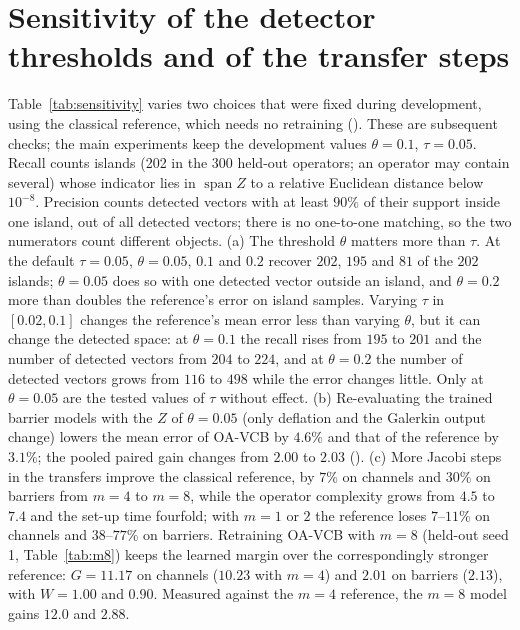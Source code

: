 \section{Sensitivity of the detector thresholds and of the transfer steps}\label{app:sensitivity}
Table~\ref{tab:sensitivity} varies two choices that were fixed during development, using the classical reference, which needs
no retraining (). These are subsequent checks; the main experiments keep
the development values $\theta = 0.1$, $\tau = 0.05$. Recall counts islands (202 in the 300 held-out operators; an operator may
contain several) whose indicator lies in $\operatorname{span}Z$ to a relative Euclidean distance below $10^{-8}$. Precision counts
detected vectors with at least $90\%$ of their support inside one island, out of all detected vectors; there is no one-to-one
matching, so the two numerators count different objects. (a) The threshold $\theta$ matters more than $\tau$. At the default
$\tau = 0.05$, $\theta = 0.05$, $0.1$ and $0.2$ recover $202$, $195$ and $81$ of the $202$ islands; $\theta = 0.05$ does so with one
detected vector outside an island, and $\theta = 0.2$ more than doubles the reference's error on island samples. Varying $\tau$
in $[0.02, 0.1]$ changes the reference's mean error less than varying $\theta$, but it can change the detected space: at
$\theta = 0.1$ the recall rises from $195$ to $201$ and the number of detected vectors from $204$ to $224$, and at $\theta = 0.2$
the number of detected vectors grows from $116$ to $498$ while the error changes little. Only at $\theta = 0.05$ are the tested
values of $\tau$ without effect. (b) Re-evaluating the trained barrier models with the $Z$ of $\theta = 0.05$ (only deflation
and the Galerkin output change) lowers the mean error of OA-VCB by $4.6\%$ and that of the reference by $3.1\%$; the pooled
paired gain changes from $2.00$ to $2.03$ (). (c) More Jacobi steps in the
transfers improve the classical reference, by $7\%$ on channels and $30\%$ on barriers from $m = 4$ to $m = 8$, while the
operator complexity grows from $4.5$ to $7.4$ and the set-up time fourfold; with $m = 1$ or $2$ the reference loses $7$--$11\%$ on
channels and $38$--$77\%$ on barriers. Retraining OA-VCB with $m = 8$ (held-out seed 1, Table~\ref{tab:m8}) keeps the learned
margin over the correspondingly stronger reference: $G = 11.17$ on channels ($10.23$ with $m = 4$) and $2.01$ on barriers
($2.13$), with $W = 1.00$ and $0.90$. Measured against the $m = 4$ reference, the $m = 8$ model gains $12.0$ and $2.88$.



